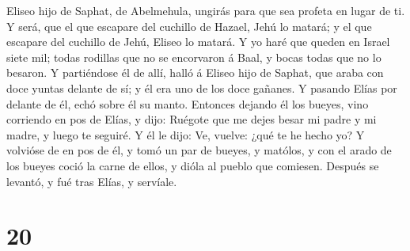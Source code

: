 Eliseo hijo de Saphat, de Abelmehula, ungirás para que sea profeta en
lugar de ti.  Y será, que el que escapare del cuchillo de
Hazael, Jehú lo matará; y el que escapare del cuchillo de Jehú, Eliseo
lo matará.  Y yo haré que queden en Israel siete mil; todas
rodillas que no se encorvaron á Baal, y bocas todas que no lo besaron.
 Y partiéndose él de allí, halló á Eliseo hijo de Saphat,
que araba con doce yuntas delante de sí; y él era uno de los doce
gañanes. Y pasando Elías por delante de él, echó sobre él su manto.
 Entonces dejando él los bueyes, vino corriendo en pos de
Elías, y dijo: Ruégote que me dejes besar mi padre y mi madre, y luego
te seguiré. Y él le dijo: Ve, vuelve: ¿qué te he hecho yo? 
Y volvióse de en pos de él, y tomó un par de bueyes, y matólos, y con el
arado de los bueyes coció la carne de ellos, y dióla al pueblo que
comiesen. Después se levantó, y fué tras Elías, y servíale.

\hypertarget{section-19}{%
\section{20}\label{section-19}}

